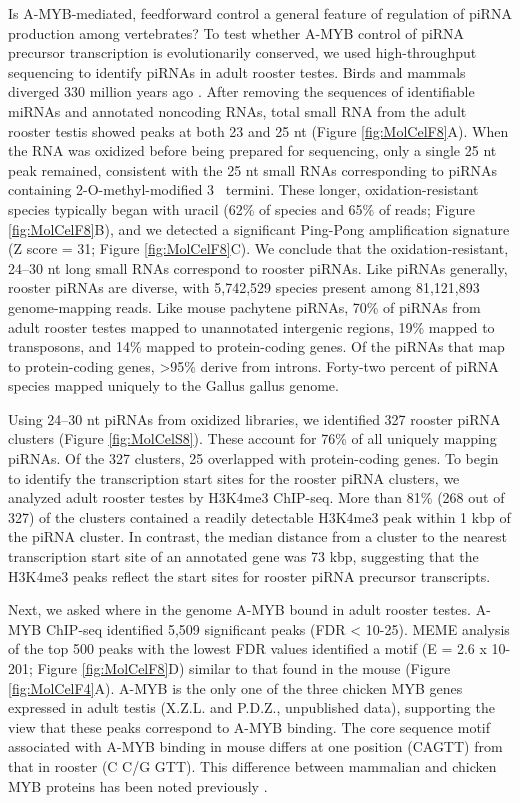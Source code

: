     Is A-MYB-mediated, feedforward control a general feature of regulation of piRNA production among vertebrates? To test whether A-MYB control of piRNA precursor transcription is evolutionarily conserved, we used high-throughput sequencing to identify piRNAs in adult rooster testes. Birds and mammals diverged 330 million years ago \citep{Benton2007}. After removing the sequences of identifiable miRNAs \citep{Burnside2008} and annotated noncoding RNAs, total small RNA from the adult rooster testis showed peaks at both 23 and 25 nt (Figure \ref{fig:MolCelF8}A). When the RNA was oxidized before being prepared for sequencing, only a single 25 nt peak remained, consistent with the 25 nt small RNAs corresponding to piRNAs containing 2\textprime-O-methyl-modified 3\textprime~ termini. These longer, oxidation-resistant species typically began with uracil (62\% of species and 65\% of reads; Figure \ref{fig:MolCelF8}B), and we detected a significant Ping-Pong amplification signature (Z score = 31; Figure \ref{fig:MolCelF8}C). We conclude that the oxidation-resistant, 24–30 nt long small RNAs correspond to rooster piRNAs. Like piRNAs generally, rooster piRNAs are diverse, with 5,742,529 species present among 81,121,893 genome-mapping reads. Like mouse pachytene piRNAs, 70\% of piRNAs from adult rooster testes mapped to unannotated intergenic regions, 19\% mapped to transposons, and 14\% mapped to protein-coding genes. Of the piRNAs that map to protein-coding genes, >95\% derive from introns. Forty-two percent of piRNA species mapped uniquely to the Gallus gallus genome.

    Using 24–30 nt piRNAs from oxidized libraries, we identified 327 rooster piRNA clusters (Figure \ref{fig:MolCelS8}). These account for 76\% of all uniquely mapping piRNAs. Of the 327 clusters, 25 overlapped with protein-coding genes. To begin to identify the transcription start sites for the rooster piRNA clusters, we analyzed adult rooster testes by H3K4me3 ChIP-seq. More than 81\% (268 out of 327) of the clusters contained a readily detectable H3K4me3 peak within 1 kbp of the piRNA cluster. In contrast, the median distance from a cluster to the nearest transcription start site of an annotated gene was 73 kbp, suggesting that the H3K4me3 peaks reflect the start sites for rooster piRNA precursor transcripts.

    Next, we asked where in the genome A-MYB bound in adult rooster testes. A-MYB ChIP-seq identified 5,509 significant peaks (FDR < 10-25). MEME analysis of the top 500 peaks with the lowest FDR values identified a motif (E = 2.6 x 10-201; Figure \ref{fig:MolCelF8}D) similar to that found in the mouse (Figure \ref{fig:MolCelF4}A). A-MYB is the only one of the three chicken MYB genes expressed in adult testis (X.Z.L. and P.D.Z., unpublished data), supporting the view that these peaks correspond to A-MYB binding. The core sequence motif associated with A-MYB binding in mouse differs at one position (CAGTT) from that in rooster (C C/G GTT). This difference between mammalian and chicken MYB proteins has been noted previously \citep{Weston1992, Deng1996}.


